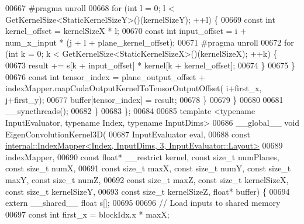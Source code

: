 \begin{DoxyCode}
00667 \textcolor{preprocessor}{        #pragma unroll}
00668         \textcolor{keywordflow}{for} (\textcolor{keywordtype}{int} l = 0; l < GetKernelSize<StaticKernelSizeY>()(kernelSizeY); ++l) \{
00669           \textcolor{keyword}{const} \textcolor{keywordtype}{int} kernel\_offset = kernelSizeX * l;
00670           \textcolor{keyword}{const} \textcolor{keywordtype}{int} input\_offset = i + num\_x\_input * (j + l + plane\_kernel\_offset);
00671 \textcolor{preprocessor}{          #pragma unroll}
00672           \textcolor{keywordflow}{for} (\textcolor{keywordtype}{int} k = 0; k < GetKernelSize<StaticKernelSizeX>()(kernelSizeX); ++k) \{
00673             result += s[k + input\_offset] * kernel[k + kernel\_offset];
00674           \}
00675         \}
00676         \textcolor{keyword}{const} \textcolor{keywordtype}{int} tensor\_index = plane\_output\_offset + indexMapper.mapCudaOutputKernelToTensorOutputOffset(
      i+first\_x, j+first\_y);
00677         buffer[tensor\_index] = result;
00678       \}
00679     \}
00680 
00681     \_\_syncthreads();
00682   \}
00683 \};
00684 
00685 \textcolor{keyword}{template} <\textcolor{keyword}{typename} InputEvaluator, \textcolor{keyword}{typename} Index, \textcolor{keyword}{typename} InputDims>
00686 \_\_global\_\_ \textcolor{keywordtype}{void} EigenConvolutionKernel3D(
00687     InputEvaluator eval,
00688     \textcolor{keyword}{const} \hyperlink{class_eigen_1_1internal_1_1_index_mapper}{internal::IndexMapper<Index, InputDims, 3, InputEvaluator::Layout>}
00689         indexMapper,
00690     \textcolor{keyword}{const} \textcolor{keywordtype}{float}* \_\_restrict kernel, \textcolor{keyword}{const} \textcolor{keywordtype}{size\_t} numPlanes, \textcolor{keyword}{const} \textcolor{keywordtype}{size\_t} numX,
00691     \textcolor{keyword}{const} \textcolor{keywordtype}{size\_t} maxX, \textcolor{keyword}{const} \textcolor{keywordtype}{size\_t} numY, \textcolor{keyword}{const} \textcolor{keywordtype}{size\_t} maxY, \textcolor{keyword}{const} \textcolor{keywordtype}{size\_t} numZ,
00692     \textcolor{keyword}{const} \textcolor{keywordtype}{size\_t} maxZ, \textcolor{keyword}{const} \textcolor{keywordtype}{size\_t} kernelSizeX, \textcolor{keyword}{const} \textcolor{keywordtype}{size\_t} kernelSizeY,
00693     \textcolor{keyword}{const} \textcolor{keywordtype}{size\_t} kernelSizeZ, \textcolor{keywordtype}{float}* buffer) \{
00694   \textcolor{keyword}{extern} \_\_shared\_\_ \textcolor{keywordtype}{float} s[];
00695 
00696   \textcolor{comment}{// Load inputs to shared memory}
00697   \textcolor{keyword}{const} \textcolor{keywordtype}{int} first\_x = blockIdx.x * maxX;

\end{DoxyCode}
